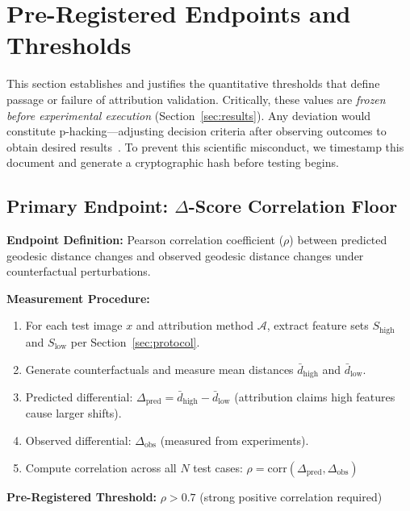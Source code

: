 
\section{Pre-Registered Endpoints and Thresholds}
\label{sec:endpoints}

This section establishes and justifies the quantitative thresholds that define passage or failure of attribution validation. Critically, these values are \textit{frozen before experimental execution} (Section~\ref{sec:results}). Any deviation would constitute p-hacking—adjusting decision criteria after observing outcomes to obtain desired results~\cite{nosek2018preregistration}. To prevent this scientific misconduct, we timestamp this document and generate a cryptographic hash before testing begins.

\subsection{Primary Endpoint: $\Delta$-Score Correlation Floor}

\textbf{Endpoint Definition:} Pearson correlation coefficient ($\rho$) between predicted geodesic distance changes and observed geodesic distance changes under counterfactual perturbations.

\textbf{Measurement Procedure:}
\begin{enumerate}
\item For each test image $x$ and attribution method $\mathcal{A}$, extract feature sets $S_{\text{high}}$ and $S_{\text{low}}$ per Section~\ref{sec:protocol}.
\item Generate counterfactuals and measure mean distances $\bar{d}_{\text{high}}$ and $\bar{d}_{\text{low}}$.
\item Predicted differential: $\Delta_{\text{pred}} = \bar{d}_{\text{high}} - \bar{d}_{\text{low}}$ (attribution claims high features cause larger shifts).
\item Observed differential: $\Delta_{\text{obs}}$ (measured from experiments).
\item Compute correlation across all $N$ test cases: $\rho = \text{corr}(\Delta_{\text{pred}}, \Delta_{\text{obs}})$
\end{enumerate}

\textbf{Pre-Registered Threshold:} $\rho > 0.7$ (strong positive correlation required)

